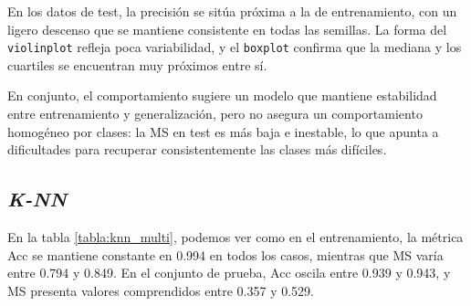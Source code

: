 \vspace{1em}

En los datos de test, la precisión se sitúa próxima a la de entrenamiento, con un ligero descenso que se mantiene consistente en todas las semillas. La forma del \texttt{violinplot} refleja poca variabilidad, y el \texttt{boxplot} confirma que la mediana y los cuartiles se encuentran muy próximos entre sí.

\vspace{1em}

En conjunto, el comportamiento sugiere un modelo que mantiene estabilidad entre entrenamiento y generalización, pero no asegura un comportamiento homogéneo por clases: la MS en test es más baja e inestable, lo que apunta a dificultades para recuperar consistentemente las clases más difíciles.

\subsection{\textit{K-NN}}
\label{subsec:knn_multi}


En la tabla \ref{tabla:knn_multi}, podemos ver como en el entrenamiento, la métrica Acc se mantiene constante en 0.994 en todos los casos, mientras que MS varía entre 0.794 y 0.849. En el conjunto de prueba, Acc oscila entre 0.939 y 0.943, y MS presenta valores comprendidos entre 0.357 y 0.529.

\vspace{1em}

